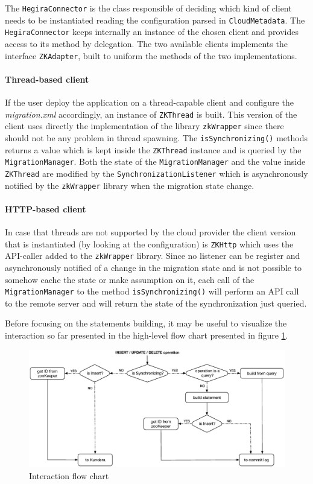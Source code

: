 \noindent The \texttt{HegiraConnector} is the class responsible of deciding which kind of client needs to be instantiated reading the configuration parsed  in \texttt{CloudMetadata}. The \texttt{HegiraConnector}  keeps internally an instance of the chosen client and provides access to its method by delegation.
The two available clients implements the interface \texttt{ZKAdapter}, built to uniform the methods of the two implementations.

\paragraph{Thread-based client} If the user deploy the application on a thread-capable client and configure the \textit{migration.xml} accordingly, an instance of \texttt{ZKThread} is built. This version of the client uses directly the implementation of the library \texttt{zkWrapper} since there should not be any problem in thread spawning.
The \texttt{isSynchronizing()} methods returns a value which is kept inside the \texttt{ZKThread} instance and is queried by the \texttt{MigrationManager}.
Both the state of the \texttt{MigrationManager} and the value inside \texttt{ZKThread} are modified by the \texttt{SynchronizationListener} which is asynchronously notified by the \texttt{zkWrapper} library when the migration state change.

\paragraph{HTTP-based client} In case that threads are not supported by the cloud provider the client version that is instantiated (by looking at the configuration) is \texttt{ZKHttp} which uses the API-caller added to the \texttt{zkWrapper} library.
Since no listener can be register and asynchronously notified of a change in the migration state and is not possible to somehow cache the state or make assumption on it, each call of the \texttt{MigrationManager} to the method \texttt{isSynchronizing()} will perform an API call to the remote server and will return the state of the synchronization just queried.


\newparagraph Before focusing on the statements building, it may be useful to visualize the interaction so far presented in the high-level flow chart presented in figure \ref{fig:flow-chart}.

\begin{figure}[tbh]
  \centering
  \includegraphics[width=13.5cm]{images/flow_chart}
  \caption{Interaction flow chart}
  \label{fig:flow-chart}
\end{figure} 

